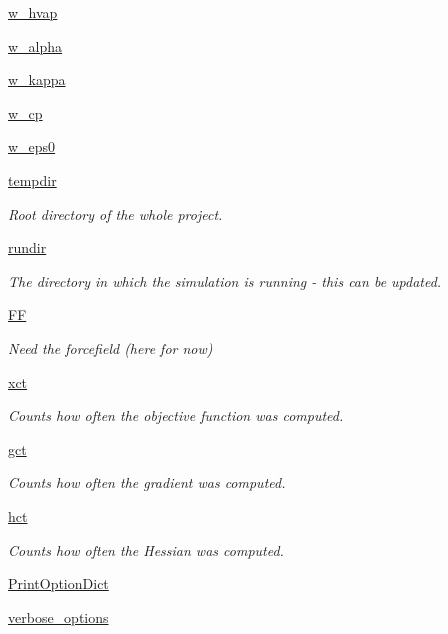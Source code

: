 \begin{DoxyCompactItemize}
\hyperlink{classforcebalance_1_1liquid_1_1Liquid_abe985fe3aaa03d9f3a1b0a90f26b774d}{w\-\_\-hvap}
\item 
\hyperlink{classforcebalance_1_1liquid_1_1Liquid_a0d36d27d8c406b53bbb1096fbb76adbb}{w\-\_\-alpha}
\item 
\hyperlink{classforcebalance_1_1liquid_1_1Liquid_a6b262d9343247a902063bf62d5f19108}{w\-\_\-kappa}
\item 
\hyperlink{classforcebalance_1_1liquid_1_1Liquid_a3809c649d95ac6c9f662d599e6b1b93d}{w\-\_\-cp}
\item 
\hyperlink{classforcebalance_1_1liquid_1_1Liquid_a75ad3ea94ec845e91499f858e7be5f27}{w\-\_\-eps0}
\item 
\hyperlink{classforcebalance_1_1target_1_1Target_aa1f01b5b78db253b5b66384ed11ed193}{tempdir}
\begin{DoxyCompactList}\small\item\em Root directory of the whole project. \end{DoxyCompactList}\item 
\hyperlink{classforcebalance_1_1target_1_1Target_a6872de5b2d4273b82336ea5b0da29c9e}{rundir}
\begin{DoxyCompactList}\small\item\em The directory in which the simulation is running -\/ this can be updated. \end{DoxyCompactList}\item 
\hyperlink{classforcebalance_1_1target_1_1Target_a38a37919783141ea37fdcf8b00ce0aaf}{F\-F}
\begin{DoxyCompactList}\small\item\em Need the forcefield (here for now) \end{DoxyCompactList}\item 
\hyperlink{classforcebalance_1_1target_1_1Target_aad2e385cfbf7b4a68f1c2cb41133fe82}{xct}
\begin{DoxyCompactList}\small\item\em Counts how often the objective function was computed. \end{DoxyCompactList}\item 
\hyperlink{classforcebalance_1_1target_1_1Target_aa625ac88c6744eb14ef281d9496d0dbb}{gct}
\begin{DoxyCompactList}\small\item\em Counts how often the gradient was computed. \end{DoxyCompactList}\item 
\hyperlink{classforcebalance_1_1target_1_1Target_a5b5a42f78052b47f29ed4b940c6111a1}{hct}
\begin{DoxyCompactList}\small\item\em Counts how often the Hessian was computed. \end{DoxyCompactList}\item 
\hyperlink{classforcebalance_1_1baseclass_1_1ForceBalanceBaseClass_a5c55e661e746d1a4443f4e0bc34ebe05}{Print\-Option\-Dict}
\item 
\hyperlink{classforcebalance_1_1baseclass_1_1ForceBalanceBaseClass_a8088e1e20cbd6bc175fb9c9fe9fa0f18}{verbose\-\_\-options}
\end{DoxyCompactItemize}


